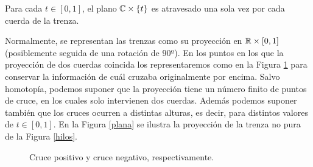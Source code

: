 \documentclass[TFG.tex]{subfiles}
\begin{document}
\begin{observacion}
Para cada $t\in[0,1]$, el plano $\mathbb{C}\times\{t\}$ es atravesado una sola vez por cada cuerda de la trenza. 
\end{observacion}

Normalmente, se representan las trenzas como su proyección en $\mathbb{R}\times[0,1]$ (posiblemente seguida de una rotación de 90º). En los puntos en los que la proyección de dos cuerdas coincida los representaremos como en la Figura \ref{cruce} para conservar la información de cuál cruzaba originalmente por encima. Salvo homotopía, podemos suponer que la proyección tiene un número finito de puntos de cruce, en los cuales solo intervienen dos cuerdas. Además podemos suponer también que los cruces ocurren a distintas alturas, es decir, para distintos valores de $t\in[0,1]$. En la Figura \ref{plana} se ilustra la proyección de la trenza no pura de la Figura \ref{hilos}. 
\begin{figure}[h!]
\centering
{}

\caption{Cruce positivo y cruce negativo, respectivamente.}\label{cruce}
\end{figure}
\end{document}
